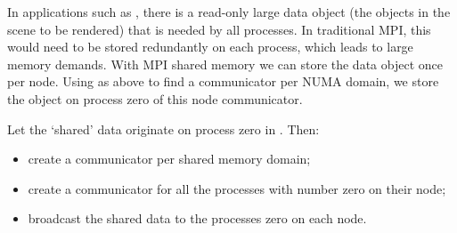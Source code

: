 In applications such as , there is a read-only
large data object (the objects in the scene to be rendered) that is
needed by all processes. In traditional MPI, this would need to be
stored redundantly on each process, which leads to large memory
demands. With MPI shared memory we can store the data object once per
node. Using as above  to find a
communicator per \ac{NUMA} domain, we store the object on process zero
of this node communicator.

\begin{exercise}
  \label{ex:shareddata}
  Let the `shared' data originate on process zero in
  . Then:
  \begin{itemize}
  \item create a communicator per shared memory domain;
  \item create a communicator for all the processes with number zero on their
    node;
  \item broadcast the shared data to the processes zero on each node.
  \end{itemize}
\end{exercise}
